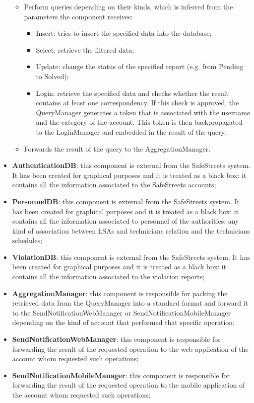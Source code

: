 \begin{itemize}
    \begin{itemize}
        \item Perform queries depending on their kinds, which is inferred from the parameters the component receives: 
        \begin{itemize}
            \item Insert: tries to insert the specified data into the database;
            \item Select: retrieve the filtered data;
            \item Update: change the status of the specified report (e.g. from Pending to Solved);
            \item Login: retrieve the specified data and checks whether the result contains at least one correspondency. If this check is approved, the QueryManager generates a token that is associated with the username and the category of the account. This token is then backpropagated to the LoginManager and embedded in the result of the query;
        \end{itemize}
        \item Forwards the result of the query to the AggregationManager.
    \end{itemize}
    \item \textbf{AuthenticationDB}: this component is external from the SafeStreets system. It has been created for graphical purposes and it is treated as a black box: it contains all the information associated to the SafeStreets accounts;
    \item \textbf{PersonnelDB}: this component is external from the SafeStreets system. It has been created for graphical purposes and it is treated as a black box: it contains all the information associated to personnel of the authorities: any kind of association between LSAs and technicians relation and the technicians schedules;
    \item \textbf{ViolationDB}: this component is external from the SafeStreets system. It has been created for graphical purposes and it is treated as a black box: it contains all the information associated to the violation reports;
    \item \textbf{AggregationManager}: this component is responsible for packing the retrieved data from the QueryManager into a standard format and forward it to the SendNotificationWebManager or SendNotificationMobileManager depending on the kind of account that performed that specific operation;
    \item \textbf{SendNotificationWebManager}: this component is responsible for forwarding the result of the requested operation to the web application of the account whom requested such operations;
    \item \textbf{SendNotificationMobileManager}: this component is responsible for forwarding the result of the requested operation to the mobile application of the account whom requested such operations;
\end{itemize}

\newpage
